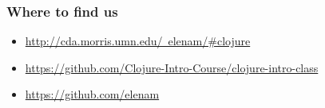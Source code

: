 \documentclass{beamer}
\begin{document}
\begin{frame}
   \frametitle{Where to find us}
\begin{itemize}
\item \href{http://cda.morris.umn.edu/~elenam/\#clojure}{http://cda.morris.umn.edu/~elenam/\#clojure}
\item \href{https://github.com/Clojure-Intro-Course/clojure-intro-class}{https://github.com/Clojure-Intro-Course/clojure-intro-class}
\item \href{https://github.com/elenam}{https://github.com/elenam}
\end{itemize}
\end{frame}
\end{document}
